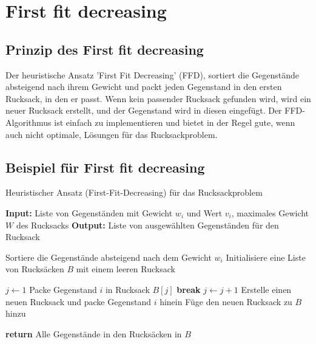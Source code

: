 \documentclass[12pt]{report}
\begin{document}

\newpage
\chapter{First fit decreasing}
\section{Prinzip des First fit decreasing}
Der heuristische Ansatz 'First Fit Decreasing' (FFD), sortiert die Gegenstände absteigend nach ihrem Gewicht und packt jeden Gegenstand in den ersten Rucksack, in den er passt. Wenn kein passender Rucksack gefunden wird, wird ein neuer Rucksack erstellt, und der Gegenstand wird in diesen eingefügt. Der FFD-Algorithmus ist einfach zu implementieren und bietet in der Regel gute, wenn auch nicht optimale, Lösungen für das Rucksackproblem. \cite{martello1987algorithms}

\section{Beispiel für First fit decreasing}
\begin{algorithm}
	\caption{Heuristischer Ansatz (First-Fit-Decreasing) für das Rucksackproblem}
	\begin{algorithmic}[1]
		\State \textbf{Input:} Liste von Gegenständen mit Gewicht $w_i$ und Wert $v_i$, maximales Gewicht $W$ des Rucksacks
		\State \textbf{Output:} Liste von ausgewählten Gegenständen für den Rucksack
		
		\State Sortiere die Gegenstände absteigend nach dem Gewicht $w_i$
		\State Initialisiere eine Liste von Rucksäcken $B$ mit einem leeren Rucksack
		
		\State $j \gets 1$
		\State Packe Gegenstand $i$ in Rucksack $B[j]$
		\State \textbf{break}
		\EndIf
		\State $j \gets j + 1$
		\EndWhile
		\State Erstelle einen neuen Rucksack und packe Gegenstand $i$ hinein
		\State Füge den neuen Rucksack zu $B$ hinzu
		\EndIf
		\EndFor
		
		\State \textbf{return} Alle Gegenstände in den Rucksäcken in $B$
	\end{algorithmic}
\end{algorithm}
\end{document}
